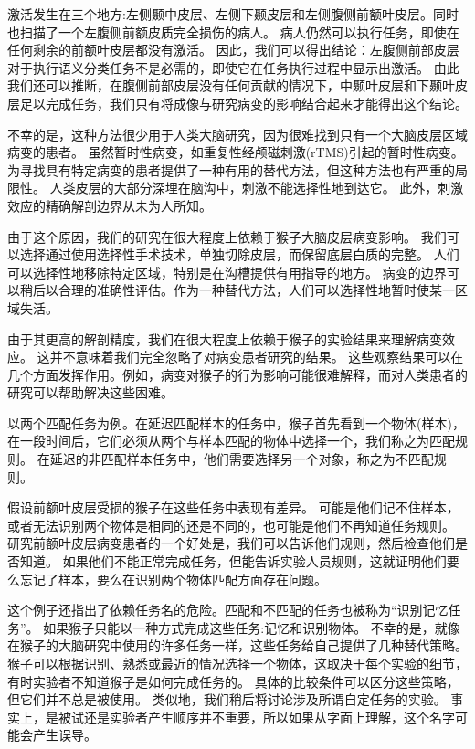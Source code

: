 \par
激活发生在三个地方:左侧颞中皮层、左侧下颞皮层和左侧腹侧前额叶皮层。同时也扫描了一个左腹侧前额皮质完全损伤的病人\cite{price1999delineating}。
病人仍然可以执行任务，即使在任何剩余的前额叶皮层都没有激活。
因此，我们可以得出结论：左腹侧前部皮层对于执行语义分类任务不是必需的，即使它在任务执行过程中显示出激活。
由此我们还可以推断，在腹侧前部皮层没有任何贡献的情况下，中颞叶皮层和下颞叶皮层足以完成任务，我们只有将成像与研究病变的影响结合起来才能得出这个结论。


\par
不幸的是，这种方法很少用于人类大脑研究，因为很难找到只有一个大脑皮层区域病变的患者。
虽然暂时性病变，如重复性经颅磁刺激(rTMS)引起的暂时性病变。
为寻找具有特定病变的患者提供了一种有用的替代方法，但这种方法也有严重的局限性。
人类皮层的大部分深埋在脑沟中，刺激不能选择性地到达它。
此外，刺激效应的精确解剖边界从未为人所知。


\par
由于这个原因，我们的研究在很大程度上依赖于猴子大脑皮层病变影响。
我们可以选择通过使用选择性手术技术，单独切除皮层，而保留底层白质的完整。
人们可以选择性地移除特定区域，特别是在沟槽提供有用指导的地方。
病变的边界可以稍后以合理的准确性评估。作为一种替代方法，人们可以选择性地暂时使某一区域失活。
\par


由于其更高的解剖精度，我们在很大程度上依赖于猴子的实验结果来理解病变效应。
这并不意味着我们完全忽略了对病变患者研究的结果。
这些观察结果可以在几个方面发挥作用。例如，病变对猴子的行为影响可能很难解释，而对人类患者的研究可以帮助解决这些困难。


\par
以两个匹配任务为例。在延迟匹配样本的任务中，猴子首先看到一个物体(样本)，在一段时间后，它们必须从两个与样本匹配的物体中选择一个，我们称之为匹配规则。
在延迟的非匹配样本任务中，他们需要选择另一个对象，称之为不匹配规则。


\par
假设前额叶皮层受损的猴子在这些任务中表现有差异。
可能是他们记不住样本，或者无法识别两个物体是相同的还是不同的，也可能是他们不再知道任务规则。
研究前额叶皮层病变患者的一个好处是，我们可以告诉他们规则，然后检查他们是否知道。
如果他们不能正常完成任务，但能告诉实验人员规则，这就证明他们要么忘记了样本，要么在识别两个物体匹配方面存在问题。

\par
这个例子还指出了依赖任务名的危险。匹配和不匹配的任务也被称为“识别记忆任务”。
如果猴子只能以一种方式完成这些任务:记忆和识别物体。
不幸的是，就像在猴子的大脑研究中使用的许多任务一样，这些任务给自己提供了几种替代策略。
猴子可以根据识别、熟悉或最近的情况选择一个物体，这取决于每个实验的细节，有时实验者不知道猴子是如何完成任务的。
具体的比较条件可以区分这些策略，但它们并不总是被使用。
类似地，我们稍后将讨论涉及所谓自定任务的实验。
事实上，是被试还是实验者产生顺序并不重要，所以如果从字面上理解，这个名字可能会产生误导。


